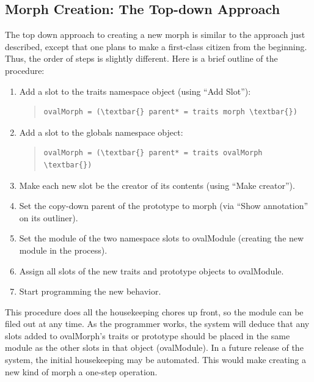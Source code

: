 \documentclass[letterpaper,10pt,english]{sphinxmanual}
\begin{document}
\subsection{Morph Creation: The Top-down Approach}
\label{morphic:morph-creation-the-top-down-approach}
The top down approach to creating a new morph is similar to the approach just described, except that one plans to make a first-class citizen from the beginning. Thus, the order of steps is slightly different. Here is a brief outline of the procedure:
\begin{enumerate}
\item {} 
Add a slot to the traits namespace object (using ``Add Slot''):
\begin{quote}

\begin{Verbatim}[commandchars=\\\{\}]
ovalMorph = (\textbar{} parent* = traits morph \textbar{})
\end{Verbatim}
\end{quote}

\item {} 
Add a slot to the globals namespace object:
\begin{quote}

\begin{Verbatim}[commandchars=\\\{\}]
ovalMorph = (\textbar{} parent* = traits ovalMorph \textbar{})
\end{Verbatim}
\end{quote}

\item {} 
Make each new slot be the creator of its contents (using ``Make creator'').

\item {} 
Set the copy-down parent of the prototype to morph (via ``Show annotation'' on its outliner).

\item {} 
Set the module of the two namespace slots to ovalModule (creating the new module in the process).

\item {} 
Assign all slots of the new traits and prototype objects to ovalModule.

\item {} 
Start programming the new behavior.

\end{enumerate}

This procedure does all the housekeeping chores up front, so the module can be filed out at any time. As the programmer works, the system will deduce that any slots added to ovalMorph's traits or prototype should be placed in the same module as the other slots in that object (ovalModule). In a future release of the system, the initial housekeeping may be automated. This would make creating a new kind of morph a one-step operation.
\end{document}
